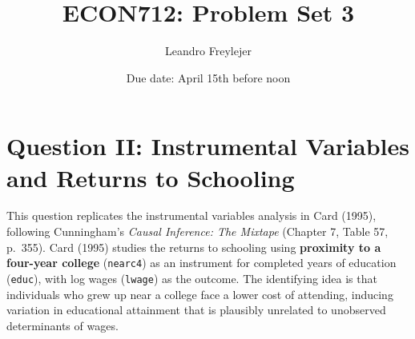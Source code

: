 \documentclass[letterpaper,12pt]{article}
\title{\vspace{-.5in} ECON712: Problem Set 3}
\author{Leandro Freylejer}
\date{Due date: April 15th before noon }
\begin{document}



\section*{Question II: Instrumental Variables and Returns to Schooling}

This question replicates the instrumental variables analysis in Card (1995), following Cunningham's \textit{Causal Inference: The Mixtape} (Chapter 7, Table 57, p.\ 355). Card (1995) studies the returns to schooling using \textbf{proximity to a four-year college} (\texttt{nearc4}) as an instrument for completed years of education (\texttt{educ}), with log wages (\texttt{lwage}) as the outcome. The identifying idea is that individuals who grew up near a college face a lower cost of attending, inducing variation in educational attainment that is plausibly unrelated to unobserved determinants of wages.
\end{document}
